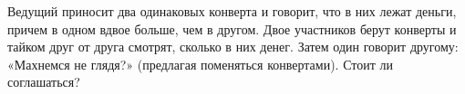 \begin{problem}
Ведущий приносит два одинаковых конверта и говорит, что в них лежат деньги, причем в одном вдвое больше, чем в другом. Двое участников берут конверты и тайком друг от друга смотрят, сколько в них денег. Затем один говорит другому: «Махнемся не глядя?» (предлагая поменяться конвертами). Стоит ли соглашаться?
\end{problem}

\begin{comment}
\begin{problem}[парадокс Монти–Холла ](сократить)
Представьте, что вы стали участником игры, в которой находитесь перед тремя дверями. Ведущий поместил за одной из трех 
пронумерованных дверей автомобиль, а за двумя другими дверями --- по козе (козы тоже пронумерованы) случайным образом --– это значит, 
что все $3! = 6$ вариантов расположения автомобиля и коз за пронумерованными дверями равновероятны). У вас нет никакой информации 
о том, что за какой дверью находится. Ведущий говорит: <<Сначала вы должны выбрать одну из дверей. После этого я открою одну из 
оставшихся дверей (при этом если вы выберете дверь, за которой находится автомобиль, то я с вероятностью $1/2$ выберу дверь, 
за которой находится коза номер $1$, и с вероятностью $1-1/2=1/2$ дверь, за которой находится коза номер $2$). Затем я предложу 
вам изменить свой первоначальный выбор и выбрать оставшуюся закрытую дверь вместо той, которую вы выбрали сначала. Вы можете 
последовать моему совету и выбрать другую дверь, либо подтвердить свой первоначальный выбор. После этого я открою дверь, 
которую вы выбрали, и вы выиграете то, что находится за этой дверью.>> Вы выбираете дверь номер $3$. Ведущий открывает дверь номер $1$ 
и показывает, что за ней находится коза. Затем ведущий предлагает вам выбрать дверь номер $2$. Увеличатся ли ваши шансы 
выиграть автомобиль, если вы последуете его совету? 
\end{problem}



\end{comment}
